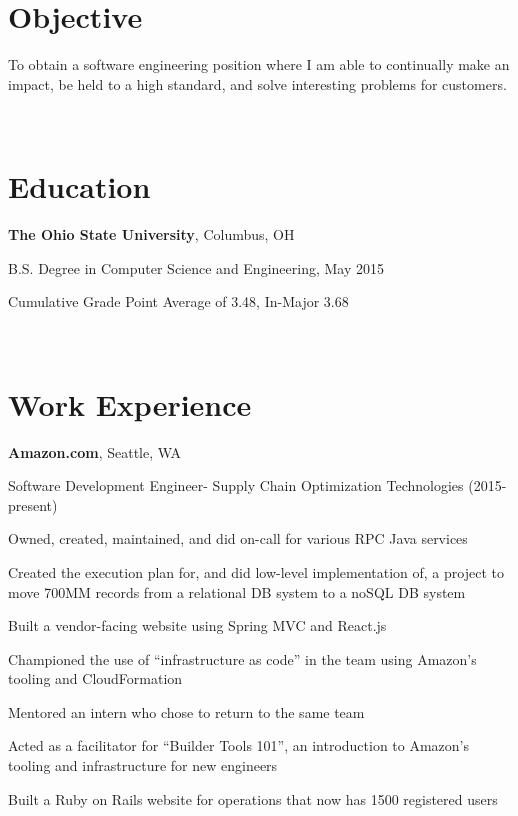 \documentclass[letterpaper]{resume}
\begin{document}
\author{Christopher John Wallace}
\maketitle

\section{Objective}
\begin{compactitem}
\item
    To obtain a software engineering position where I am able to continually
    make an impact, be held to a high standard, and solve interesting problems
    for customers.
\end{compactitem}

~

\section{Education}
\textbf{The Ohio State University}, Columbus, OH
\begin{compactitem}
\item B.S. Degree in Computer Science and Engineering, May 2015
\item Cumulative Grade Point Average of 3.48, In-Major 3.68
\end{compactitem}

~

\section{Work Experience}
\textbf{Amazon.com}, Seattle, WA

Software Development Engineer- Supply Chain Optimization Technologies (2015-present)
\begin{compactitem}

\item Owned, created, maintained, and did on-call for various RPC Java services
\item Created the execution plan for, and did low-level implementation of, a
    project to move 700MM records from a relational DB system to a noSQL DB
    system
\item Built a vendor-facing website using Spring MVC and React.js
\item Championed the use of ``infrastructure as code'' in the team using
    Amazon's tooling and CloudFormation
\item Mentored an intern who chose to return to the same team
\item Acted as a facilitator for ``Builder Tools 101'', an introduction to
    Amazon's tooling and infrastructure for new engineers
\item Built a Ruby on Rails website for operations that now
    has 1500 registered users
\end{compactitem}
\end{document}
